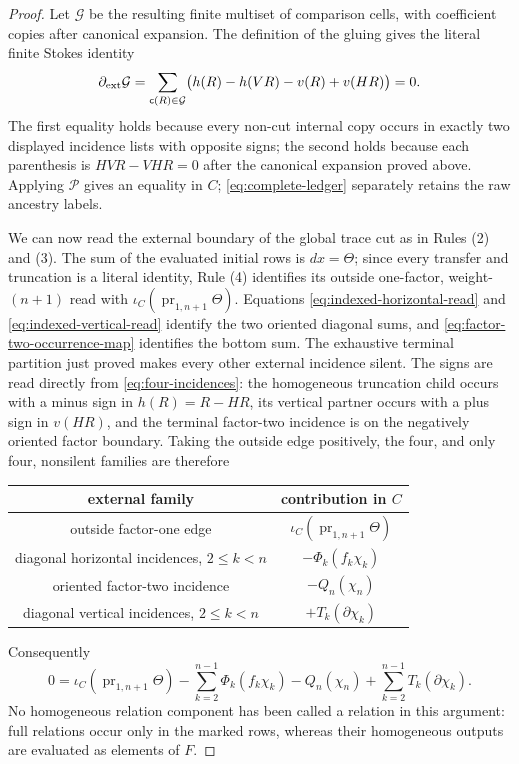 \documentclass[11pt]{amsart}
\theoremstyle{remark}
\newcommand{\pr}{\operatorname{pr}}
\begin{document}
\begin{proof}
	Let $\mathcal G$ be the resulting finite multiset of comparison cells,
	with coefficient copies after canonical expansion.  The definition of
	the gluing gives the literal finite Stokes identity
	\begin{equation}\label{eq:finite-stokes}
	 \partial_{\rm ext}\mathcal G
	 =\sum_{\mathsf c(R)\in\mathcal G}
	 \bigl(h(R)-h(VR)-v(R)+v(HR)\bigr)=0.
	\end{equation}
	The first equality holds because every non-cut internal copy occurs in
	exactly two displayed incidence lists with opposite signs; the second
	holds because each parenthesis is $HVR-VHR=0$ after the canonical
	expansion proved above.  Applying $\mathcal P$ gives an equality in $C$;
	\eqref{eq:complete-ledger} separately retains the raw ancestry labels.

	We can now read the external boundary of the global trace cut as in
	Rules (2) and (3).  The sum of the evaluated initial rows is $dx=\Theta$;
	since every transfer and truncation is a literal identity, Rule (4)
	identifies its outside one-factor, weight-$(n+1)$ read with
	$\iota_C(\pr_{1,n+1}\Theta)$.  Equations \eqref{eq:indexed-horizontal-read} and
	\eqref{eq:indexed-vertical-read} identify the two oriented diagonal
	sums, and \eqref{eq:factor-two-occurrence-map} identifies the bottom
	sum.  The exhaustive terminal partition just proved makes every other
	external incidence silent.  The signs are read directly from
	\eqref{eq:four-incidences}: the homogeneous truncation child occurs with
	a minus sign in $h(R)=R-HR$, its vertical partner occurs with a plus sign
	in $v(HR)$, and the terminal factor-two incidence is on the negatively
	oriented factor boundary.  Taking the outside edge positively, the four, and
	only four, nonsilent families are therefore
	\begin{center}
	\begin{tabular}{c|c}
	 external family & contribution in $C$ \\ \hline
	 outside factor-one edge &
	 $\iota_C(\pr_{1,n+1}\Theta)$ \\
	 diagonal horizontal incidences, $2\leq k<n$ &
	 $-\Phi_k(f_k\chi_k)$ \\
	 oriented factor-two incidence & $-Q_n(\chi_n)$ \\
	 diagonal vertical incidences, $2\leq k<n$ &
	 $+T_k(\partial\chi_k)$
	\end{tabular}
	\end{center}
	Consequently
	\begin{equation}\label{eq:evaluated-complete-ledger}
	 0=\iota_C(\pr_{1,n+1}\Theta)
	   -\sum_{k=2}^{n-1}\Phi_k(f_k\chi_k)-Q_n(\chi_n)
	   +\sum_{k=2}^{n-1}T_k(\partial\chi_k).
	\end{equation}
	No homogeneous relation component has been called a relation in this
	argument: full relations occur only in the marked rows, whereas their
	homogeneous outputs are evaluated as elements of $F$.


\end{proof}
\end{document}
